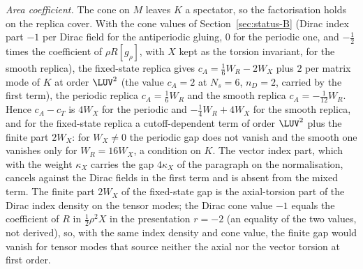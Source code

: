 \emph{Area coefficient.} The cone on \(M\) leaves \(K\) a spectator, so the factorisation holds on the replica cover. With the cone values of Section~\ref{sec:status-B} (Dirac index part \(-1\) per Dirac field for the antiperiodic gluing, \(0\) for the periodic one, and \(-\tfrac12\) times the coefficient of \(\rho R[g_\rho]\), with \(X\) kept as the torsion invariant, for the smooth replica), the fixed-state replica gives \(c_A=\tfrac16W_R-2W_X\) plus \(2\) per matrix mode of \(K\) at order \(\LUV^2\) (the value \(c_A=2\) at \(N_s=6\), \(n_D=2\), carried by the first term), the periodic replica \(c_A=\tfrac16W_R\) and the smooth replica \(c_A=-\tfrac1{12}W_R\). Hence \(c_A-c_T\) is \(4W_X\) for the periodic and \(-\tfrac14W_R+4W_X\) for the smooth replica, and for the fixed-state replica a cutoff-dependent term of order \(\LUV^2\) plus the finite part \(2W_X\): for \(W_X\neq0\) the periodic gap does not vanish and the smooth one vanishes only for \(W_R=16W_X\), a condition on \(K\). The vector index part, which with the weight \(\kappa_X\) carries the gap \(4\kappa_X\) of the paragraph on the normalisation, cancels against the Dirac fields in the first term and is absent from the mixed term. The finite part \(2W_X\) of the fixed-state gap is the axial-torsion part of the Dirac index density on the tensor modes; the Dirac cone value \(-1\) equals the coefficient of \(R\) in \(\tfrac12\rho^2X\) in the presentation \(r=-2\) (an equality of the two values, not derived), so, with the same index density and cone value, the finite gap would vanish for tensor modes that source neither the axial nor the vector torsion at first order.

